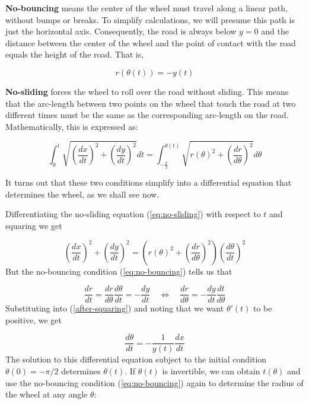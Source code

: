 \documentclass{article}
\theoremstyle{theorem}
\theoremstyle{theorem}
\begin{document}
\noindent \textbf{No-bouncing} means the center of the wheel must
travel along a linear path, without bumps or breaks. To simplify
calculations, we will presume this path is just the horizontal
axis. Consequently, the road is always below $y=0$ and the distance
between the center of the wheel and the point of contact with the road
equals the height of the road. That is,

\begin{equation}
  \label{eq:no-bouncing}
  r(\theta(t)) = -y(t)
\end{equation}

\noindent \textbf{No-sliding} forces the wheel to roll over the road
without sliding. This means that the arc-length between two points on
the wheel that touch the road at two different times must be the same
as the corresponding arc-length on the road. Mathematically, this is
expressed as:

\begin{equation}
  \label{eq:no-sliding}
  \int_0^t{\sqrt{\left(\frac{dx}{dt}\right)^2+\left(\frac{dy}{dt}\right)^2}} dt = \int_{-\frac{\pi}{2}}^{\theta(t)}{\sqrt{r(\theta)^2+\left(\frac{dr}{d\theta}\right)^2}} d\theta
\end{equation}

It turns out that these two conditions simplify into a differential
equation that determines the wheel, as we shall see now.

Differentiating the no-sliding equation (\ref{eq:no-sliding}) with
respect to $t$ and squaring we get

\begin{equation}
  \label{after-squaring}
  \left(\frac{dx}{dt}\right)^2+\left(\frac{dy}{dt}\right)^2 = \left(r(\theta)^2+\left(\frac{dr}{d\theta}\right)^2\right)\left(\frac{d\theta}{dt}\right)^2
\end{equation}
But the no-bouncing condition (\ref{eq:no-bouncing}) tells us that

\begin{equation}
  \frac{dr}{dt} = \frac{dr}{d\theta}\frac{d\theta}{dt} = -\frac{dy}{dt} \quad \Leftrightarrow \quad \frac{dr}{d\theta} = -\frac{dy}{dt}\frac{dt}{d\theta}
\end{equation}
Substituting into (\ref{after-squaring}) and noting that we want
$\theta'(t)$ to be positive, we get

\begin{equation}
  \label{ivp}
  \frac{d\theta}{dt}=-\frac{1}{y(t)}\frac{dx}{dt}
\end{equation}
The solution to this differential equation subject to the initial
condition $\theta(0) = -\pi/2$ determines $\theta(t)$. If $\theta(t)$
is invertible, we can obtain $t(\theta)$ and use the no-bouncing
condition (\ref{eq:no-bouncing}) again to determine the radius of the
wheel at any angle $\theta$:
\end{document}
